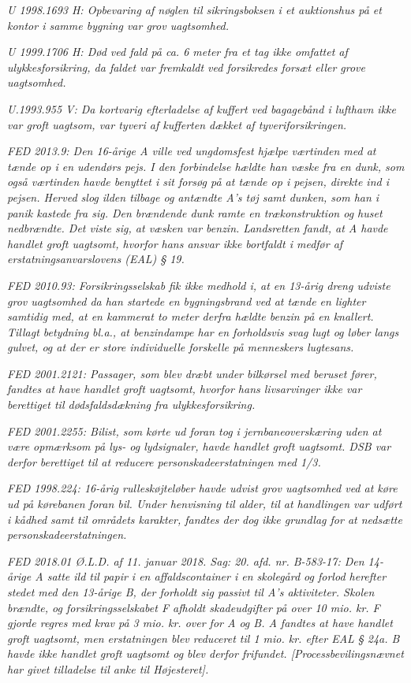 \documentclass[]{book}
\begin{document}
\emph{U 1998.1693 H: Opbevaring af nøglen til sikringsboksen i et auktionshus på et kontor i samme bygning var grov uagtsomhed.}

\emph{U 1999.1706 H: Død ved fald på ca. 6 meter fra et tag ikke omfattet af ulykkesforsikring, da faldet var fremkaldt ved forsikredes forsæt eller grove uagtsomhed.}

\emph{U.1993.955 V: Da kortvarig efterladelse af kuffert ved bagagebånd i lufthavn ikke var groft uagtsom, var tyveri af kufferten dækket af tyveriforsikringen.}

\emph{FED 2013.9: Den 16-årige A ville ved ungdomsfest hjælpe værtinden med at tænde op i en udendørs pejs. I den forbindelse hældte han væske fra en dunk, som også værtinden havde benyttet i sit forsøg på at tænde op i pejsen, direkte ind i pejsen. Herved slog ilden tilbage og antændte A's tøj samt dunken, som han i panik kastede fra sig. Den brændende dunk ramte en trækonstruktion og huset nedbrændte. Det viste sig, at væsken var benzin. Landsretten fandt, at A havde handlet groft uagtsomt, hvorfor hans ansvar ikke bortfaldt i medfør af erstatningsanvarslovens (EAL) § 19.}

\emph{FED 2010.93: Forsikringsselskab fik ikke medhold i, at en 13-årig dreng udviste grov uagtsomhed da han startede en bygningsbrand ved at tænde en lighter samtidig med, at en kammerat to meter derfra hældte benzin på en knallert. Tillagt betydning bl.a., at benzindampe har en forholdsvis svag lugt og løber langs gulvet, og at der er store individuelle forskelle på menneskers lugtesans.}

\emph{FED 2001.2121: Passager, som blev dræbt under bilkørsel med beruset fører, fandtes at have handlet groft uagtsomt, hvorfor hans livsarvinger ikke var berettiget til dødsfaldsdækning fra ulykkesforsikring.}

\emph{FED 2001.2255: Bilist, som kørte ud foran tog i jernbaneoverskæring uden at være opmærksom på lys- og lydsignaler, havde handlet groft uagtsomt. DSB var derfor berettiget til at reducere personskadeerstatningen med 1/3.}

\emph{FED 1998.224: 16-årig rulleskøjteløber havde udvist grov uagtsomhed ved at køre ud på kørebanen foran bil. Under henvisning til alder, til at handlingen var udført i kådhed samt til områdets karakter, fandtes der dog ikke grundlag for at nedsætte personskadeerstatningen.}

\emph{FED 2018.01 Ø.L.D. af 11. januar 2018. Sag: 20. afd. nr. B-583-17: Den 14-årige A satte ild til papir i en affaldscontainer i en skolegård og forlod herefter stedet med den 13-årige B, der forholdt sig passivt til A's aktiviteter. Skolen brændte, og forsikringsselskabet F afholdt skadeudgifter på over 10 mio. kr. F gjorde regres med krav på 3 mio. kr. over for A og B. A fandtes at have handlet groft uagtsomt, men erstatningen blev reduceret til 1 mio. kr. efter EAL § 24a. B havde ikke handlet groft uagtsomt og blev derfor frifundet. {[}Processbevilingsnævnet har givet tilladelse til anke til Højesteret{]}.}
\end{document}
